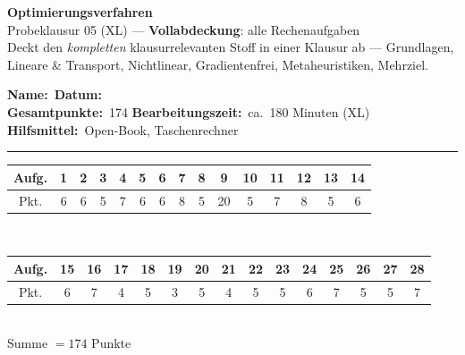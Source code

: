 \documentclass[a4paper,11pt]{article}
\begin{document}
\begin{center}
  {\LARGE\color{accent}\textbf{Optimierungsverfahren}}\\[3pt]
  {\large Probeklausur 05 (XL) --- \textbf{Vollabdeckung}: alle Rechenaufgaben}\\[2pt]
  {\small Deckt den \emph{kompletten} klausurrelevanten Stoff in einer Klausur ab ---
  Grundlagen, Lineare \& Transport, Nichtlinear, Gradientenfrei, Metaheuristiken, Mehrziel.}
\end{center}
\vspace{2mm}
\noindent\textbf{Name:}\ \underline{\hspace{6cm}}\hfill\textbf{Datum:}\ \underline{\hspace{4cm}}\\[4pt]
\noindent\textbf{Gesamtpunkte:}\ 174 \hfill \textbf{Bearbeitungszeit:}\ ca.\ 180 Minuten (XL) \hfill \textbf{Hilfsmittel:}\ Open-Book, Taschenrechner\\[3pt]
{\color{gridcol}\rule{\linewidth}{0.4pt}}
\par\vspace{1mm}
\par\vspace{2mm}
\noindent\renewcommand{\arraystretch}{1.2}
\begin{center}\footnotesize
\begin{tabular}{|c|*{14}{c|}}
\hline
Aufg. & 1 & 2 & 3 & 4 & 5 & 6 & 7 & 8 & 9 & 10 & 11 & 12 & 13 & 14\\\hline
Pkt. & 6 & 6 & 5 & 7 & 6 & 6 & 8 & 5 & 20 & 5 & 7 & 8 & 5 & 6\\\hline
\end{tabular}\\[2pt]
\begin{tabular}{|c|*{14}{c|}}
\hline
Aufg. & 15 & 16 & 17 & 18 & 19 & 20 & 21 & 22 & 23 & 24 & 25 & 26 & 27 & 28\\\hline
Pkt. & 6 & 7 & 4 & 5 & 3 & 5 & 4 & 5 & 5 & 6 & 7 & 5 & 5 & 7\\\hline
\end{tabular}\\[2pt]
{\footnotesize Summe $=174$ Punkte}
\end{center}
\end{document}
